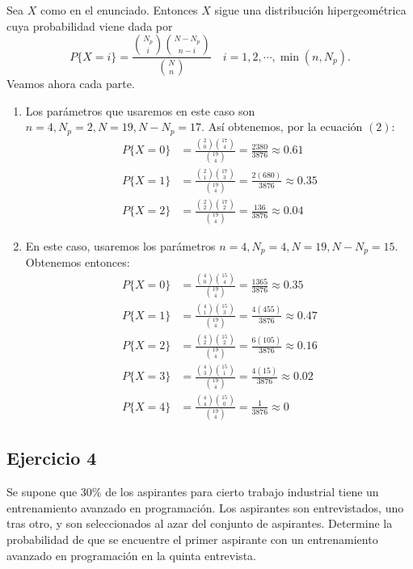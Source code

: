 \begin{sol}
	Sea $X$ como en el enunciado. Entonces $X$ sigue una distribución hipergeométrica cuya probabilidad viene dada por
	\begin{equation}
		P\{ X=i \} = \frac{\binom{N_p}{i} \binom{N-N_p}{n-i}}{\binom{N}{n}} \quad i=1,2,\cdots, \min(n,N_p).
	\end{equation}
	Veamos ahora cada parte.
	\begin{enumerate}
		\item Los parámetros que usaremos en este caso son $n=4,N_p=2,N=19,N-N_p=17$. Así obtenemos, por la ecuación $(2)$:
		\begin{align*}
			P\{X=0\} &= \frac{\binom{2}{0} \binom{17}{4}}{\binom{19}{4}} = \frac{2380}{3876} \approx 0.61 \\
			P\{X=1\} &= \frac{\binom{2}{1} \binom{17}{3}}{\binom{19}{4}} = \frac{2(680)}{3876} \approx 0.35 \\
			P\{X=2\} &= \frac{\binom{2}{2} \binom{17}{2}}{\binom{19}{4}} = \frac{136}{3876} \approx 0.04 
		\end{align*}
		\item En este caso, usaremos los parámetros $n=4,N_p=4,N=19,N-N_p=15$. Obtenemos entonces:
		\begin{align*}
		P\{X=0\} &= \frac{\binom{4}{0} \binom{15}{4}}{\binom{19}{4}} = \frac{1365}{3876} \approx 0.35 \\
		P\{X=1\} &= \frac{\binom{4}{1} \binom{15}{3}}{\binom{19}{4}} = \frac{4(455)}{3876} \approx 0.47 \\
		P\{X=2\} &= \frac{\binom{4}{2} \binom{15}{2}}{\binom{19}{4}} = \frac{6(105)}{3876} \approx 0.16 \\
		P\{X=3\} &= \frac{\binom{4}{3} \binom{15}{1}}{\binom{19}{4}} = \frac{4(15)}{3876} \approx 0.02 \\
		P\{X=4\} &= \frac{\binom{4}{4} \binom{15}{0}}{\binom{19}{4}} = \frac{1}{3876} \approx 0 
		\end{align*}
	\end{enumerate}
\end{sol}
\subsection*{Ejercicio 4}
	Se supone que 30\% de los aspirantes para cierto trabajo industrial tiene un entrenamiento avanzado
	en programación. Los aspirantes son entrevistados, uno tras otro, y son seleccionados al azar del conjunto de
	aspirantes. Determine la probabilidad de que se encuentre el primer aspirante con un entrenamiento avanzado en
	programación en la quinta entrevista.

